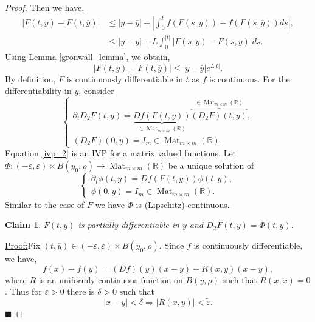 \documentclass[10pt]{article}
\newtheorem{claim}{Claim}
\newenvironment{claimproof}[1]{\par\noindent\underline{Proof:}\space#1}{\hfill $\blacksquare$}
\DeclareMathOperator{\Mat}{Mat}
\newcommand{\R}[0]{\mathbb{R}}
\begin{document}
\begin{proof}
Then we have,
\begin{align*}
  \vert F(t,y)-F(t,\overline{y})\vert&\leq \vert y -\overline{y}\vert + \left\vert \int_0^tf(F(s,y))-f(F(s,\overline{y}))ds\right\vert,\\
  &\leq \vert y-\overline{y}\vert+L\int_0^{\vert t \vert}\vert F(s,y)-F(s,\overline{y})\vert ds.
\end{align*}
Using Lemma \ref{gronwall_lemma}, we obtain,
\begin{equation*}
  \vert F(t,y)-F(t,\overline{y})\vert\leq \vert y -\overline{y}\vert e^{L\vert t\vert}.
\end{equation*}
By definition, $F$ is continuously differentiable in $t$ as $f$ is continuous. For the differentiability in $y$, consider 
\begin{equation*}
  \begin{cases}
    \partial_t D_2F(t,y) = \underbrace{Df(F(t,y))}_{\in\Mat_{m\times m}(\R)}\overbrace{(D_2F)(t,y)}^{\in\Mat_{m\times m}(\R)},\\
    (D_2F)(0,y) = I_m\in \Mat_{m\times m}(\R).
  \end{cases}
  \tag{P2}
  \label{ivp_2}
\end{equation*}
Equation \eqref{ivp_2} is an IVP for a matrix valued functions. Let $\Phi:(-\varepsilon,\varepsilon)\times B(y_0,\rho)\to\Mat_{m\times m}(\R)$ be a unique solution of 
\begin{equation*}
  \begin{cases}
    \partial_t\phi(t,y) = Df(F(t,y))\phi(t,y),\\
    \phi(0,y) = I_m\in \Mat_{m\times m}(\R).
  \end{cases}
  \tag{P3}
  \label{ivp_3}
\end{equation*}
Similar to the case of $F$ we have $\Phi$ is (Lipschitz)-continuous.
\begin{claim}
  $F(t,y)$ is partially differentiable in $y$ and $D_2F(t,y) = \Phi(t,y)$.
\end{claim}
\begin{claimproof}
Fix $(t,\overline{y})\in(-\varepsilon,\varepsilon)\times B(y_0,\rho)$. Since $f$ is continuously differentiable, we have,
\begin{equation*}
  f(x)-f(y) = (Df)(y)(x-y)+R(x,y)(x-y),
\end{equation*}
where $R$ is an uniformly continuous function on $\overline{B(y,\rho)}$ such that $R(x,x)=0$. Thus for $\tilde{\varepsilon}>0$ there is $\delta>0$ such that 
\begin{equation*}
  \vert x-y\vert<\delta\Rightarrow \vert R(x,y)\vert<\tilde{\varepsilon}.

\end{equation*}
\end{claimproof}
\end{proof}
\end{document}
